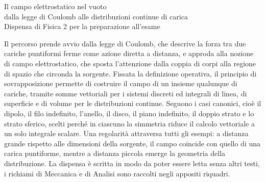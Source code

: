 \documentclass[11pt,a4paper]{article}
\begin{document}
\begin{center}
{\LARGE Il campo elettrostatico nel vuoto\\[0.4ex]
dalla legge di Coulomb alle distribuzioni continue di carica}\\[1.2ex]
{\large Dispensa di Fisica 2 per la preparazione all'esame}
\end{center}

\vspace{1em}

\noindent
Il percorso prende avvio dalla legge di Coulomb, che descrive la forza tra due cariche puntiformi ferme come azione diretta a distanza, e approda alla nozione di campo elettrostatico, che sposta l'attenzione dalla coppia di corpi alla regione di spazio che circonda la sorgente. Fissata la definizione operativa, il principio di sovrapposizione permette di costruire il campo di un insieme qualunque di cariche, tramite somme vettoriali per i sistemi discreti ed integrali di linea, di superficie e di volume per le distribuzioni continue. Seguono i casi canonici, cioè il dipolo, il filo indefinito, l'anello, il disco, il piano indefinito, il doppio strato e lo strato sferico, scelti perché in ciascuno la simmetria riduce il calcolo vettoriale a un solo integrale scalare. Una regolarità attraversa tutti gli esempi: a distanza grande rispetto alle dimensioni della sorgente, il campo coincide con quello di una carica puntiforme, mentre a distanza piccola emerge la geometria della distribuzione. La dispensa è scritta in modo da poter essere letta senza altri testi, i richiami di Meccanica e di Analisi sono raccolti negli appositi riquadri.

\medskip
\end{document}
